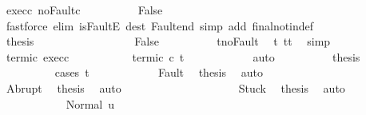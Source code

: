 \begin{isabellebody}
\ exec{\isacharunderscore}c{}{\isacharprime}\ noFault{\isacharunderscore}c{}{\isacharprime}\isanewline
\ \ \ \ \ \ \ \ \isamarkupfalse%
\ False\isanewline
\ \ \ \ \ \ \ \ \ \ \isamarkupfalse%
\ {\isacharparenleft}fastforce\ elim{\isacharcolon}\ isFaultE\ dest{\isacharcolon}\ Fault{\isacharunderscore}end\ simp\ add{\isacharcolon}\ final{\isacharunderscore}notin{\isacharunderscore}def{\isacharparenright}\isanewline
\ \ \ \ \ \ \ \ \isamarkupfalse%
\ {\isacharquery}thesis\ \isacommand{{\isachardot}{\isachardot}}\isamarkupfalse%
\isanewline
\ \ \ \ \ \ \isamarkupfalse%
\isanewline
\ \ \ \ \ \ \ \ \isamarkupfalse%
\ False\isanewline
\ \ \ \ \ \ \ \ \isamarkupfalse%
\ t{\isacharprime}{\isacharunderscore}noFault\ \isamarkupfalse%
\ t{\isacharprime}{\isacharcolon}\ {\isachardoublequoteopen}t{\isacharprime}{\isacharequal}t{\isachardoublequoteclose}\ \isamarkupfalse%
\ simp\isanewline
\ \ \ \ \ \ \ \ \isamarkupfalse%
\ termi{\isacharunderscore}c{}{\isacharprime}\ exec{\isacharunderscore}c{}{\isacharprime}\ \isanewline
\ \ \ \ \ \ \ \ \isamarkupfalse%
\ termi{\isacharunderscore}c{}{\isacharprime}{\isacharcolon}\ {\isachardoublequoteopen}{\isasymGamma}{\isasymturnstile}c{}{\isacharprime}{\isasymdown}\ t{\isachardoublequoteclose}\isanewline
\ \ \ \ \ \ \ \ \ \ \isamarkupfalse%
\ auto\isanewline
\ \ \ \ \ \ \ \ \isamarkupfalse%
\ {\isacharquery}thesis\isanewline
\ \ \ \ \ \ \ \ \isamarkupfalse%
\ {\isacharparenleft}cases\ t{\isacharparenright}\isanewline
\ \ \ \ \ \ \ \ \ \ \isamarkupfalse%
\ Fault\ \isamarkupfalse%
\ {\isacharquery}thesis\ \isamarkupfalse%
\ auto\isanewline
\ \ \ \ \ \ \ \ \isamarkupfalse%
\isanewline
\ \ \ \ \ \ \ \ \ \ \isamarkupfalse%
\ Abrupt\ \isamarkupfalse%
\ {\isacharquery}thesis\ \isamarkupfalse%
\ auto\isanewline
\ \ \ \ \ \ \ \ \isamarkupfalse%
\isanewline
\ \ \ \ \ \ \ \ \ \ \isamarkupfalse%
\ Stuck\ \isamarkupfalse%
\ {\isacharquery}thesis\ \isamarkupfalse%
\ auto\isanewline
\ \ \ \ \ \ \ \ \isamarkupfalse%
\isanewline
\ \ \ \ \ \ \ \ \ \ \isamarkupfalse%
\ {\isacharparenleft}Normal\ u{\isacharparenright}\isanewline
\ \ \ \ \ \ \ \ \ \ \isamarkupfalse%

\end{isabellebody}
